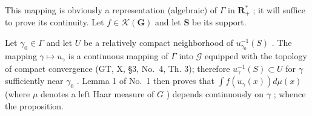 This mapping is obviously a representation (algebraic) of \(\Gamma\) in \(\mathbf{R}_+^*\) ; it will suffice to prove its continuity. Let \(f \in \mathcal{K}(\mathbf{G})\) and let \(\mathbf{S}\) be its support.

Let \(\gamma_0 \in \Gamma\) and let \(U\) be a relatively compact neighborhood of \(u_{\gamma_0}^{-1}(S)\) . The mapping \(\gamma \mapsto u_\gamma\) is a continuous mapping of \(\Gamma\) into \(\mathcal{G}\) equipped with the topology of compact convergence (GT, X, §3, No.~4, Th. 3); therefore \(u_{\gamma}^{-1}(S) \subset U\) for \(\gamma\) sufficiently near \(\gamma_0\) . Lemma 1 of No.~1 then proves that \(\int f(u_\gamma(x)) d\mu(x)\) (where \(\mu\) denotes a left Haar measure of \(G\) ) depends continuously on \(\gamma\) ; whence the proposition.

